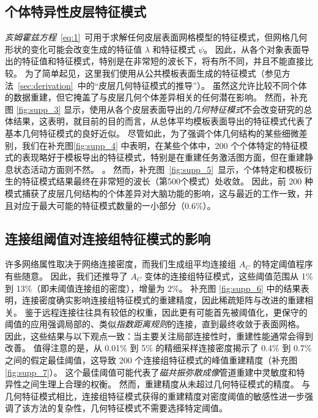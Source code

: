 \documentclass[lang=cn,a4paper,newtx,citestyle=gb7714-2015, bibstyle=gb7714-2015]{elegantpaper}
\begin{document}
\subsection{个体特异性皮层特征模式} \label{sec:individual_specific}

\textit{亥姆霍兹方程}~\ref{eq:1}~可用于求解任何皮层表面网格模型的特征模式，但网格几何形状的变化可能会改变生成的特征值 $ \lambda $ 和特征模式 $ \psi $。
因此，从各个对象表面导出的特征值和特征模式，特别是在非常短的波长下，将有所不同，并且不能直接比较\cite{henderson2022empirical,chen2022individuality}。
为了简单起见，这里我们使用从公共模板表面生成的特征模式（参见方法~\ref{sec:derivation}~中的“皮层几何特征模式的推导”）。
虽然这允许比较不同个体的数据重建，但它掩盖了与皮层几何个体差异相关的任何潜在影响。
然而，补充图 \ref{fig:supp_3} 显示，使用从各个皮层表面导出的\textit{几何特征模式}不会改变研究的总体结果，这表明，就目前的目的而言，从总体平均模板表面导出的特征模式代表了基本几何特征模式的良好近似。
尽管如此，为了强调个体几何结构的某些细微差别，我们在补充图\ref{fig:supp_4} 中表明，在某些个体中，200 个个体特定的特征模式的表现略好于模板导出的特征模式，特别是在重建任务激活图方面，但在重建静息状态活动方面则不然。 。 
然而，补充图~\ref{fig:supp_5}~显示，个体特定和模板衍生的特征模式结果最终在非常短的波长（第500个模式）处收敛。
因此，前 200 种模式捕获了皮层几何结构的个体差异对大脑功能的影响，这与最近的工作\cite{chen2022individuality}一致，并且对应于最大可能的特征模式数量的一小部分（0.6\%）。



\subsection{连接组阈值对连接组特征模式的影响} \label{sec:thresholding_effect}

许多网络属性取决于网络连接密度，而我们生成组平均连接组 $ A_C $ 的特定阈值程序有些随意。
因此，我们还推导了 $ A_C $ 变体的连接组特征模式，这些阈值范围从 1\% 到 13\%（即未阈值连接组的密度），增量为 2\%。
补充图 \ref{fig:supp_6} 中的结果表明，连接密度确实影响连接组特征模式的重建精度，因此稀疏矩阵与改进的重建相关。
鉴于远程连接往往具有较低的权重，因此更有可能首先被阈值化，更保守的阈值的应用强调局部的、类似\textit{指数距离规则}的连接，直到最终收敛于表面网格。
因此，这些结果与以下观点一致：当主要关注局部连接性时，重建性能通常会得到改善。
值得注意的是，从 0.01\% 到 5\% 的精细采样连接密度揭示了 0.4\% 到 0.7\% 之间的假定最佳阈值，这导致 200 个连接组特征模式的峰值重建精度（补充图 \ref{fig:supp_7}）。
这个最佳阈值可能代表了\textit{磁共振弥散成像}管道重建中灵敏度和特异性之间生理上合理的权衡。
然而，重建精度从未超过几何特征模式的精度。
与几何特征模式相比，连接组特征模式获得的重建精度对密度阈值的敏感性进一步强调了该方法的复杂性，几何特征模式不需要选择特定阈值。
\end{document}

